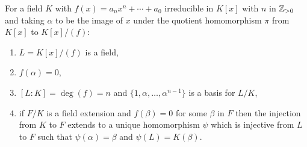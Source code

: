 For a field $K$ with $f(x) = a_n x^n + \cdots + a_0$ irreducible in $K[x]$ with
$n$ in $\mathbb{Z}_{> 0}$ and taking $\alpha$ to be the image of $x$ under the quotient
homomorphism $\pi$ from $K[x]$ to $K[x] / (f)$: \begin{enumerate}
    \item $L = K[x] / (f)$ is a field,
    \item $f(\alpha) = 0$,
    \item $[L : K] = \deg(f) = n$ and $\{1, \alpha, \ldots, \alpha^{n - 1}\}$
        is a basis for $L / K$,
    \item if $F / K$ is a field extension and $f(\beta) = 0$ for some $\beta$ in $F$
        then the injection from $K$ to $F$ extends to a unique homomorphism
        $\psi$ which is injective from $L$ to $F$ such that $\psi(\alpha) = \beta$ and
        $\psi(L) = K(\beta)$.
\end{enumerate} 

